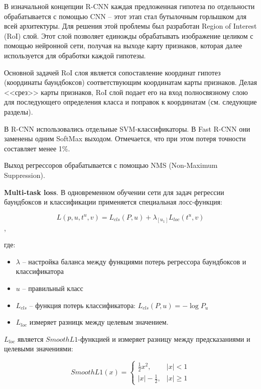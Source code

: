 В изначальной концепции R-CNN каждая предложенная гипотеза по отдельности обрабатывается с помощью CNN -- этот этап стал бутылочным горлышком для всей архитектуры. Для решения этой проблемы был разработан Region of Interest (RoI) слой. Этот слой позволяет единожды обрабатывать изображение целиком с помощью нейронной сети, получая на выходе карту признаков, которая далее используется для обработки каждой гипотезы.

Основной задачей RoI слоя является сопоставление координат гипотез (координаты баундбоксов) соответствующим координатам карты признаков. Делая <<срез>> карты признаков, RoI слой подает его на вход полносвязному слою для последующего определения класса и поправок к координатам (см. следующие разделы).

В R-CNN использовались отдельные SVM-классификаторы. В Fast R-CNN они заменены одним SoftMax выходом. Отмечается, что при этом потеря точности составляет менее 1\%.

Выход регрессоров обрабатывается с помощью NMS (Non-Maximum Suppression).

\textbf{Multi-task loss}. В одновременном обучении сети для задач регрессии баундбоксов и классификации применяется специальная лосс-функция:

\begin{equation}
	L(p, u, t^u, v) = L_{cls}(P, u) + \lambda_{[u_1]}L_{loc}(t^u, v)
\end{equation},

где:

\begin{itemize}
	\item $\lambda$ -- настройка баланса между функциями потерь регрессора баундбоксов и классификатора
	\item $u$ -- правильный класс
	\item $L_{cls}$ -- функция потерь классификатора: $L_{cls}(P, u) = -\log P_u$
	\item $L_{loc}$ измеряет разницк между целевым значением.
\end{itemize}

$L_{loc}$ является $SmoothL1$-функцией и измеряет разницу между предсказаниями и целевыми значениями:

\begin{equation}
	SmoothL1(x) = 
	\begin{cases}
		\frac{1}{2}x^2, & |x| < 1 \\
		|x| - \frac{1}{2}, & |x| \geq 1
	\end{cases}
\end{equation}


